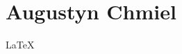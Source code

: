 \documentclass[a4paper,12pt]{report}
\begin{document}
	\section{\protect\colorbox[RGB]{255,214,76}{Augustyn Chmiel}} \label{roz:Adres_1}
	\LaTeX{}
\newpage
\tableofcontents
\end{document}
